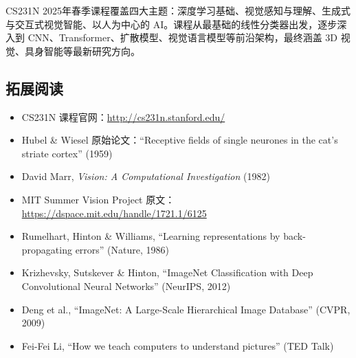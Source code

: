 CS231N 2025年春季课程覆盖四大主题：深度学习基础、视觉感知与理解、生成式与交互式视觉智能、以人为中心的 AI。课程从最基础的线性分类器出发，逐步深入到 CNN、Transformer、扩散模型、视觉语言模型等前沿架构，最终涵盖 3D 视觉、具身智能等最新研究方向。


\subsection{拓展阅读}

\begin{itemize}
    \item CS231N 课程官网：\url{http://cs231n.stanford.edu/}
    \item Hubel \& Wiesel 原始论文：``Receptive fields of single neurones in the cat's striate cortex'' (1959)
    \item David Marr, \textit{Vision: A Computational Investigation} (1982)
    \item MIT Summer Vision Project 原文：\url{https://dspace.mit.edu/handle/1721.1/6125}
    \item Rumelhart, Hinton \& Williams, ``Learning representations by back-propagating errors'' (Nature, 1986)
    \item Krizhevsky, Sutskever \& Hinton, ``ImageNet Classification with Deep Convolutional Neural Networks'' (NeurIPS, 2012)
    \item Deng et al., ``ImageNet: A Large-Scale Hierarchical Image Database'' (CVPR, 2009)
    \item Fei-Fei Li, ``How we teach computers to understand pictures'' (TED Talk)
\end{itemize}


